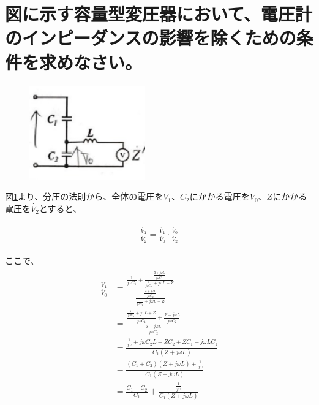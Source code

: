 \documentclass[a4paper,11pt]{jsarticle}
\begin{document}
\title{}
\author{}
\date{\today}


\section{図に示す容量型変圧器において、電圧計のインピーダンスの影響を除くための条件を求めなさい。}
\begin{figure}[htbp]
  \centering
  \includegraphics[width=5cm]{fig5.eps}
  \caption{}\label{fig1}
\end{figure}

図\ref{fig1}より、分圧の法則から、全体の電圧を$\dot{V_{1}}$、$C_{2}$にかかる電圧を$\dot{V_{0}}$、$Z$にかかる電圧を$\dot{V_{2}}$とすると、

\begin{align}
  \begin{split}
    \frac{\dot{V_{1}}}{\dot{V_{2}}}=\frac{\dot{V_{1}}}{\dot{V_{0}}}\cdot \frac{\dot{V_{0}}}{\dot{V_{2}}}
    \label{eq1}
  \end{split}
\end{align}

ここで、
\begin{align}
  \begin{split}
    \frac{\dot{V_{1}}}{\dot{V_{0}}}
    &=\frac{\frac{1}{j\omega C_{1}}+\frac{\frac{Z+j\omega L}{j\omega C_{2}}}{\frac{1}{j\omega C_{2}}+j\omega L+Z}}{\frac{\frac{Z+j\omega L}{j\omega C_{2}}}{\frac{1}{j\omega C_{2}}+j\omega L+Z}}\\
    &=\frac{\frac{\frac{1}{j\omega C_{2}}+j\omega L+Z}{j\omega C_{1}}+\frac{Z+j\omega L}{j\omega C_{2}}}{\frac{Z+j\omega L}{j\omega C_{2}}}\\
    &=\frac{\frac{1}{j\omega }+j\omega C_{2}L+ZC_{2}+ZC_{1}+j\omega LC_{1}}{C_{1}(Z+j\omega L)}\\
    &=\frac{(C_{1}+C_{2})(Z+j\omega L)+\frac{1}{j\omega }}{C_{1}(Z+j\omega L)}\\
    &=\frac{C_{1}+C_{2}}{C_{1}}+\frac{\frac{1}{j\omega }}{C_{1}(Z+j\omega L)}
    \label{eq2}
  \end{split}
\end{align}
\end{document}
